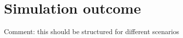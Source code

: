 \chapter{Simulation outcome}
\label{ch:Simulation}
Comment: this should be structured for different scenarios
